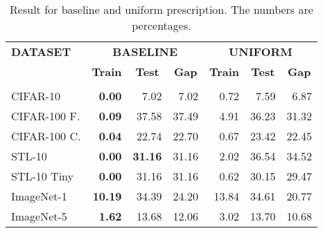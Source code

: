 \documentclass[letterpaper]{article}
\begin{document}
\begin{table}[h]
  \caption{Result for baseline and uniform prescription. The numbers are percentages.}
  \label{tab:expd}
  \begin{center}
    \addtolength{\tabcolsep}{-3pt}
    \begin{tabular}{lrrrrrr}
      \textbf{DATASET}  & \multicolumn{3}{c}{\textbf{BASELINE}} & \multicolumn{3}{c}{\textbf{UNIFORM}} \\
      & \multicolumn{1}{c}{\small\textbf{Train}} & \multicolumn{1}{c}{\small\textbf{Test}} & \multicolumn{1}{c}{\small\textbf{Gap}} & \multicolumn{1}{c}{\small\textbf{Train}} & \multicolumn{1}{c}{\small\textbf{Test}} & \multicolumn{1}{c}{\small\textbf{Gap}} \\
      \hline \\
      CIFAR-10 & \textbf{0.00} & 7.02 & 7.02 & 0.72 & 7.59 & 6.87 \\
      CIFAR-100 F. & \textbf{0.09} & 37.58 & 37.49 & 4.91 & 36.23 & 31.32 \\
      CIFAR-100 C. & \textbf{0.04} & 22.74 & 22.70 & 0.67 & 23.42 & 22.45 \\
      STL-10 & \textbf{0.00} & \textbf{31.16} & 31.16 & 2.02 & 36.54 & 34.52 \\
      STL-10 Tiny & \textbf{0.00} & 31.16 & 31.16 & 0.62 & 30.15 & 29.47 \\
      ImageNet-1 & \textbf{10.19} & 34.39 & 24.20 & 13.84 & 34.61 & 20.77 \\
      ImageNet-5 & \textbf{1.62} & 13.68 & 12.06 & 3.02 & 13.70 & 10.68 \\
    \end{tabular}
    \addtolength{\tabcolsep}{4pt}
    \vspace{-10pt}
  \end{center}
\end{table}
\end{document}

